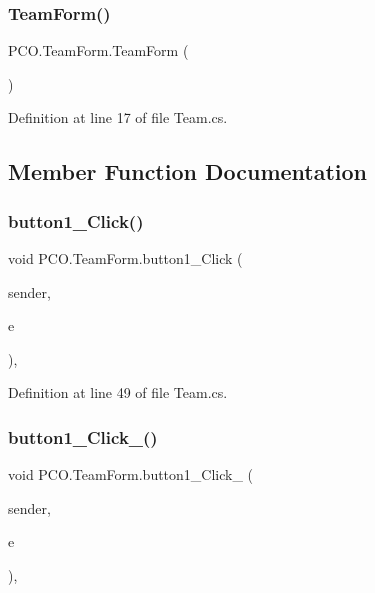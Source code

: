 \subsubsection{\texorpdfstring{Team\+Form()}{TeamForm()}}
{\footnotesize\ttfamily P\+C\+O.\+Team\+Form.\+Team\+Form (\begin{DoxyParamCaption}{ }\end{DoxyParamCaption})\hspace{0.3cm}{\ttfamily [inline]}}



Definition at line 17 of file Team.\+cs.



\subsection{Member Function Documentation}
\mbox{\label{classPCO_1_1TeamForm_adfeb099cd1dfd602bb850fb481a473ea}} 
\subsubsection{\texorpdfstring{button1\+\_\+\+Click()}{button1\_Click()}}
{\footnotesize\ttfamily void P\+C\+O.\+Team\+Form.\+button1\+\_\+\+Click (\begin{DoxyParamCaption}\item[{object}]{sender,  }\item[{Event\+Args}]{e }\end{DoxyParamCaption})\hspace{0.3cm}{\ttfamily [inline]}, {\ttfamily [private]}}



Definition at line 49 of file Team.\+cs.

\mbox{\label{classPCO_1_1TeamForm_a708f7c82354169ea5f8501d0bd9e0d1a}} 
\subsubsection{\texorpdfstring{button1\+\_\+\+Click\+\_()}{button1\_Click\_1()}}
{\footnotesize\ttfamily void P\+C\+O.\+Team\+Form.\+button1\+\_\+\+Click\+\_ (\begin{DoxyParamCaption}\item[{object}]{sender,  }\item[{Event\+Args}]{e }\end{DoxyParamCaption})\hspace{0.3cm}{\ttfamily [inline]}, {\ttfamily [private]}}



